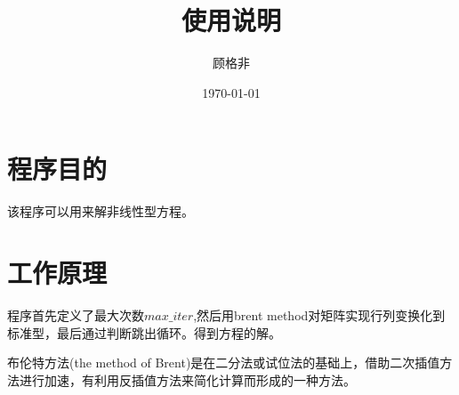 \documentclass{ctexart}
\title{使用说明}
\author{顾格非}
\date{\today}
\begin{document}
\maketitle

\section{程序目的}
该程序可以用来解非线性型方程。
\section{工作原理}
程序首先定义了最大次数$max\_iter$,然后用brent method对矩阵实现行列变换化到标准型，最后通过判断跳出循环。得到方程的解。

布伦特方法(the method of Brent)是在二分法或试位法的基础上，借助二次插值方法进行加速，有利用反插值方法来简化计算而形成的一种方法。
\end{document}
